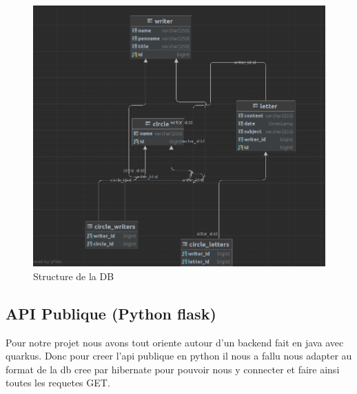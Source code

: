 \documentclass[a4paper, 12pt]{article}
\begin{document}
\begin{figure}[h]
    \centering
    \includegraphics[width=0.6\linewidth]{db}
    \caption{Structure de la DB}
    \label{fig:enter-label}
\end{figure}

\newpage

\subsection{API Publique (Python flask)}

Pour notre projet nous avons tout oriente autour d'un backend fait en 
java avec quarkus. Donc pour creer l'api publique en python il nous a 
fallu nous adapter au format de la db cree par hibernate pour pouvoir 
nous y connecter et faire ainsi toutes les requetes GET.
\end{document}

